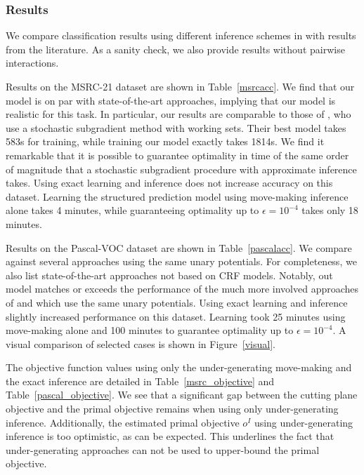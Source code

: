 \subsubsection{Results}
We compare classification results using different inference schemes in
with results from the literature. As a sanity check, we
also provide results without pairwise interactions.

Results on the MSRC-21 dataset are shown in Table~\ref{msrcacc}.
We find that our model is on par with state-of-the-art approaches, implying
that our model is realistic for this task. In particular, our results are comparable to those of
\citet{lucchi2013learning}, who use a stochastic subgradient method with working sets.
Their best model takes 583s for training, while training our model exactly takes 1814s.
We find it remarkable that it is possible to guarantee optimality in time of
the same order of magnitude that a stochastic subgradient procedure with
approximate inference takes. Using exact learning and inference does not increase accuracy
on this dataset.
Learning the structured prediction model using move-making inference alone
takes 4 minutes, while guaranteeing optimality up to  $\epsilon=10^{-4}$
takes only 18 minutes.

Results on the Pascal-VOC dataset are shown in Table~\ref{pascalacc}.
We compare against several approaches using the same unary potentials.
For completeness, we also list state-of-the-art approaches not based on CRF models.
Notably, out model matches or exceeds the performance of the much more involved approaches of
\citet{krahenbuhl2012efficient} and \citet{dann2012pottics} which use the same
unary potentials.
Using exact learning and inference slightly increased performance on this dataset.
Learning took 25 minutes using move-making alone and 100 minutes to guarantee optimality
up to $\epsilon=10^{-4}$.
A visual comparison of selected cases is shown in Figure~\ref{visual}.


The objective function values using only the under-generating move-making and
the exact inference are detailed in Table~\ref{msrc_objective} and Table~\ref{pascal_objective}.
We see that a significant gap between the cutting plane objective and the primal objective
remains when using only under-generating inference.
Additionally, the estimated primal objective $o^I$ using under-generating inference is
too optimistic, as can be expected. This underlines the fact that
under-generating approaches can not be used to upper-bound the primal
objective.


